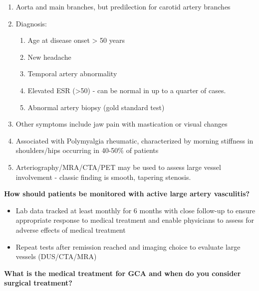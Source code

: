 \documentclass[
]{book}
\begin{document}
\begin{enumerate}
\def\labelenumi{\arabic{enumi}.}
\item
  Aorta and main branches, but predilection for carotid artery
  branches\citep{bongartz2006}
\item
  Diagnosis:

  \begin{enumerate}
  \def\labelenumii{\arabic{enumii}.}
  \item
    Age at disease onset \textgreater{} 50 years
  \item
    New headache
  \item
    Temporal artery abnormality
  \item
    Elevated ESR (\textgreater50) - can be normal in up to a quarter of cases.
  \item
    Abnormal artery biopsy (gold standard test)
  \end{enumerate}
\item
  Other symptoms include jaw pain with mastication or visual changes
\item
  Associated with Polymyalgia rheumatic, characterized by morning
  stiffness in shoulders/hips occurring in 40-50\% of patients
\item
  Arteriography/MRA/CTA/PET may be used to assess large vessel
  involvement - classic finding is smooth, tapering stenosis.
\end{enumerate}

\textbf{How should patients be monitored with active large artery
vasculitis?}

\begin{itemize}
\item
  Lab data tracked at least monthly for 6 months with close follow-up
  to ensure appropriate response to medical treatment and enable
  physicians to assess for adverse effects of medical treatment
\item
  Repeat tests after remission reached and imaging choice to evaluate
  large vessels (DUS/CTA/MRA)
\end{itemize}

\textbf{What is the medical treatment for GCA and when do you consider
surgical treatment?}
\end{document}
